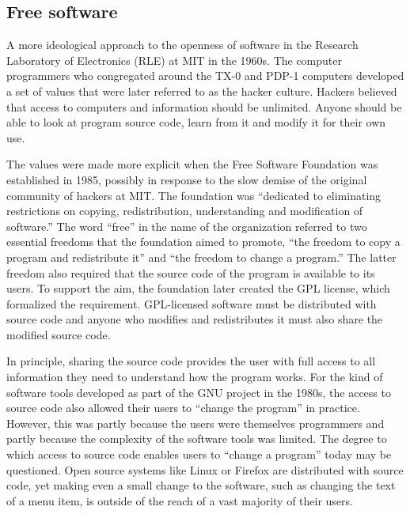 \subsection{Free software}
A more ideological approach to the openness of software in the Research Laboratory of Electronics
(RLE) at MIT in the 1960s. The computer programmers who congregated around the TX-0 and PDP-1
computers developed a set of values that were later referred to as the hacker
culture. Hackers believed that access to computers and information should be
unlimited. Anyone should be able to look at program source code, learn from it and modify it
for their own use.

The values were made more explicit when the Free Software Foundation was established in 1985,
possibly in response to the slow demise of the original community of hackers at MIT.
The foundation was ``dedicated to eliminating restrictions on copying, redistribution,
understanding and modification of software.'' The word ``free'' in the name of the organization
referred to two essential freedoms that the foundation aimed to promote, ``the freedom to copy
a program and redistribute it'' and ``the freedom to change a
program.'' The latter freedom also required that the source
code of the program is available to its users. To support the aim, the foundation later created
the GPL license, which formalized the requirement. GPL-licensed software must be distributed
with source code and anyone who modifies and redistributes it must also share the modified
source code.

In principle, sharing the source code provides the user with full access to all information
they need to understand how the program works. For the kind of software tools developed as part
of the GNU project in the 1980s, the access to source code also allowed their users to ``change
the program'' in practice. However, this was partly because the users were themselves programmers
and partly because the complexity of the software tools was limited. The degree to which
access to source code enables users to ``change a program'' today may be questioned.
Open source systems like Linux or Firefox are distributed with
source code, yet making even a small change to the software, such as changing the text of
a menu item, is outside of the reach of a vast majority of their users.

